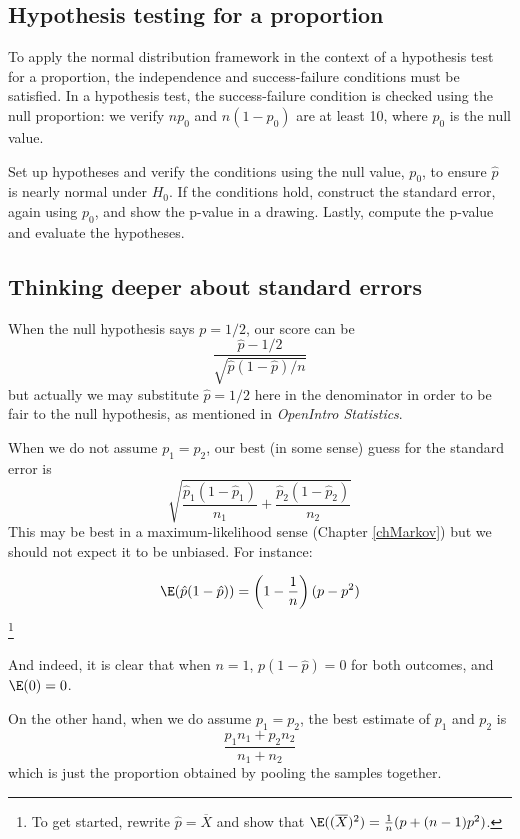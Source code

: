 \subsection{Hypothesis testing for a proportion}
\label{htForPropSection}

To apply the normal distribution framework in the context of a hypothesis test for a proportion, the independence and success-failure conditions must be satisfied. In a hypothesis test, the success-failure condition is checked using the null proportion: we verify $np_0$ and $n(1-p_0)$ are at least 10, where $p_0$ is the null value.

\begin{termBox}{
Set up hypotheses and verify the conditions using the null value, $p_0$, to ensure $\hat{p}$ is nearly normal under $H_0$. If the conditions hold, construct the standard error, again using $p_0$, and show the p-value in a drawing. Lastly, compute the p-value and evaluate the hypotheses.}
\end{termBox}


\subsection{Thinking deeper about standard errors}

When the null hypothesis says $p=1/2$, our score can be
\[
	\frac{\hat p - 1/2}{\sqrt{\hat p(1-\hat p)/n}}
\]
but actually we may substitute $\hat p=1/2$ here in the denominator in order to be fair to the null hypothesis, as mentioned in \emph{OpenIntro Statistics}.

When we do not assume $p_1=p_2$, our best (in some sense) guess for the standard error is
\[
	\sqrt{\frac{\hat p_1(1-\hat p_1)}{n_1} + \frac{\hat p_2(1-\hat p_2)}{n_2}}
\]
This may be best in a maximum-likelihood sense (Chapter \ref{chMarkov}) but we should not expect it to be unbiased. For instance:
\begin{exercise}
\[
	\E(\hat p(1-\hat p)) = \left(1-\frac1n\right)(p-p^2)
\]\footnote{To get started, rewrite $\hat p=\overline X$ and show that $\E((\overline X)^2) = \frac1n (p+(n-1)p^2)$.}
\end{exercise}
And indeed, it is clear that when $n=1$, $p(1-\hat p) = 0$ for both outcomes, and $\E(0)=0$.

On the other hand, when we do assume $p_1=p_2$, the best estimate of $p_1$ and $p_2$ is
\[
	\frac{p_1n_1+p_2n_2}{n_1+n_2}
\]
which is just the proportion obtained by pooling the samples together. 

